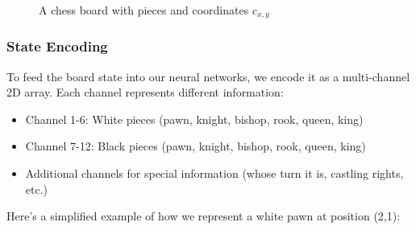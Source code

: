 \documentclass[11pt]{article}
\begin{document}
\begin{figure}[ht]
    \caption{A chess board with pieces and coordinates $c_{x,y}$}
    \label{fig:chess_array}
\end{figure}

\subsubsection{State Encoding}

To feed the board state into our neural networks, we encode it as a multi-channel 2D array. Each channel represents different information:

\begin{itemize}
    \item Channel 1-6: White pieces (pawn, knight, bishop, rook, queen, king)
    \item Channel 7-12: Black pieces (pawn, knight, bishop, rook, queen, king)
    \item Additional channels for special information (whose turn it is, castling rights, etc.)
\end{itemize}

Here's a simplified example of how we represent a white pawn at position (2,1):


\end{document}
\end{tikzpicture}
\end{figure}
\end{document}
\end{tikzpicture}
\end{figure}
\end{document}
